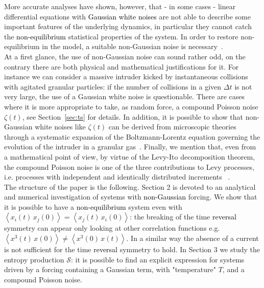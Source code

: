 \documentclass[12pt]{iopart}
\newcommand{\lx} {\left}
\newcommand{\rx} {\right}
\newcommand{\ave}[1] {\lx\langle #1 \rx\rangle}
\newcommand{\cS} {\mathcal{S}}
\begin{document}
More accurate analyses have shown, however, that - in some cases -  linear differential equations with \textcolor{black}{Gaussian white noises} 
are not able to describe some important features of the underlying dynamics, in particular they cannot catch the \textcolor{black}{non-equilibrium} statistical properties of the system. In order to restore 
non-equilibrium in the model, a suitable non-Gaussian noise is necessary~\cite{lucente2023revealing}.\\
At a first glance, the use of non-Gaussian noise can sound rather odd,
on the contrary  there are both   physical and  mathematical justifications for it.
For instance  we can consider a massive intruder  kicked by instantaneous collisions with agitated granular particles:
if the number of collisions in a given $\Delta t$ is not  very large,
the use of a Gaussian white noise is questionable. There are cases where it is more appropriate to take, as random force,
 a compound Poisson noise  $\zeta(t)$, see Section~\ref{sec:ts} for details.
In addition, it is possible to  show that non-Gaussian white noises like $\zeta(t)$  can be derived from microscopic theories through a systematic expansion of the Boltzmann-Lorentz equation governing the evolution of the intruder in a granular gas~\cite{kanazawa2012stochastic,kanazawa2015minimal,kanazawa2015asymptotic,kanazawa2017statistical}.
 Finally, we mention that,
  even from a mathematical point of view, by virtue of the Levy-Ito decomposition theorem, 
 the compound Poisson noise is one of the three contributions to Levy processes, i.e. processes with
  independent and identically distributed increments ~\cite{ken1999levy,kyprianou2014fluctuations,schilling2016introduction}. 
  \\
  The structure of the paper is the following.
  Section 2 is devoted to an analytical  and numerical investigation of systems with \textcolor{black}{non-Gaussian} forcing.
  We show  that it is possible to have a \textcolor{black}{non-equilibrium} system  even with  $\ave{x_i(t)\, x_j (0)}=\ave{x_j(t)\, x_i (0)}$:
  the breaking of the time \textcolor{black}{reversal} symmetry can  appear only looking at  other correlation functions e.g.  $\ave{x^3(t)\, x (0)}\neq \ave{x^3(0)\, x (t) }$.
  In a similar way the absence of a current is not sufficient for the time \textcolor{black}{reversal} symmetry to hold.
In Section 3  we study the entropy production $\cS$: it is possible to find an explicit expression
for systems driven by a forcing containing a  Gaussian term, with "temperature" $T$, and a compound Poisson noise.
\end{document}
